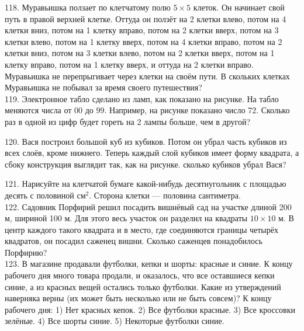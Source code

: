 118. Муравьишка ползает по клетчатому полю $5\times5$ клеток. Он начинает свой путь в правой верхней клетке. Оттуда он ползёт на 2 клетки влево, потом на 4 клетки вниз, потом на 1 клетку вправо, потом на 2 клетки вверх, потом на 3 клетки влево, потом на 1 клетку вверх, потом на 4 клетки вправо, потом на 2 клетки вниз, потом на 3 клетки влево, потом на 2 клетки вверх, потом на 1 клетку вправо, потом на 1 клетку вверх, и оттуда на 2 клетки вправо. Муравьишка не перепрыгивает через клетки на своём пути. В скольких клетках Муравьишка не побывал за время своего путешествия?\\
119. Электронное табло сделано из ламп, как показано на рисунке. На табло меняются числа от 00 до 99. Например, на рисунке показано число 72. Сколько раз в одной из цифр будет гореть на 2 лампы больше, чем в другой?
\begin{center}
\begin{figure}[ht!]
\end{figure}
\end{center}
120. Вася построил большой куб из кубиков. Потом он убрал часть кубиков из всех слоёв, кроме нижнего. Теперь каждый слой кубиков имеет форму квадрата, а сбоку конструкция выглядит так, как на рисунке. сколько кубиков убрал Вася?
\begin{center}
\begin{figure}[ht!]
\end{figure}
\end{center}
121. Нарисуйте на клетчатой бумаге какой-нибудь десятиугольник с площадью десять с половиной $\text{см}^2.$ Сторона клетки --- половина сантиметра.\\
122. Садовник Порфирий решил посадить вишнёвый сад на участке длиной 200 м, шириной 100 м. Для этого весь участок он разделил на квадраты $10\times10$ м. В центр каждого такого квадрата и в место, где соединяются границы четырёх квадратов, он посадил саженец вишни. Сколько саженцев понадобилось Порфирию?\\
123. В магазине продавали футболки, кепки и шорты: красные и синие. К концу рабочего дня много товара продали, и оказалось, что все оставшиеся кепки синие, а из красных вещей остались только футболки. Какие из утверждений наверняка верны (их может быть несколько или не быть совсем)? К концу рабочего дня: 1) Нет красных кепок. 2) Все футболки красные. 3) Все кроссовки зелёные. 4) Все шорты синие. 5) Некоторые футболки синие.\\
